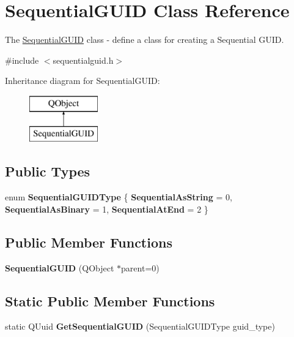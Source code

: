 \hypertarget{class_sequential_g_u_i_d}{}\section{Sequential\+G\+U\+ID Class Reference}
\label{class_sequential_g_u_i_d}


The \hyperlink{class_sequential_g_u_i_d}{Sequential\+G\+U\+ID} class -\/ define a class for creating a Sequential G\+U\+ID.  




{\ttfamily \#include $<$sequentialguid.\+h$>$}

Inheritance diagram for Sequential\+G\+U\+ID\+:\begin{figure}[H]
\begin{center}
\leavevmode
\includegraphics[height=2.000000cm]{class_sequential_g_u_i_d}
\end{center}
\end{figure}
\subsection*{Public Types}
\begin{DoxyCompactItemize}
\item 
\mbox{\label{class_sequential_g_u_i_d_a085c09b21b940489a82002cc044ed6ea}} 
enum {\bfseries Sequential\+G\+U\+I\+D\+Type} \{ {\bfseries Sequential\+As\+String} = 0, 
{\bfseries Sequential\+As\+Binary} = 1, 
{\bfseries Sequential\+At\+End} = 2
 \}
\end{DoxyCompactItemize}
\subsection*{Public Member Functions}
\begin{DoxyCompactItemize}
\item 
\mbox{\label{class_sequential_g_u_i_d_a0e87930b667cd86c011099c287961421}} 
{\bfseries Sequential\+G\+U\+ID} (Q\+Object $\ast$parent=0)
\end{DoxyCompactItemize}
\subsection*{Static Public Member Functions}
\begin{DoxyCompactItemize}
\item 
\mbox{\label{class_sequential_g_u_i_d_a25eea64f60dd43c7c21539f7b47a82e2}} 
static Q\+Uuid {\bfseries Get\+Sequential\+G\+U\+ID} (Sequential\+G\+U\+I\+D\+Type guid\+\_\+type)
\end{DoxyCompactItemize}
